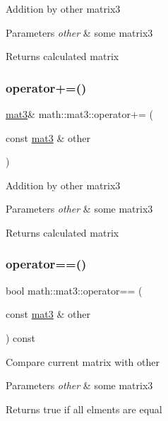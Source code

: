 Addition by other matrix3 
\begin{DoxyParams}{Parameters}
{\em other} & some matrix3 \\
\hline
\end{DoxyParams}
\begin{DoxyReturn}{Returns}
calculated matrix 
\end{DoxyReturn}
\mbox{\label{structmath_1_1mat3_a7517611ee9bfdee69f05000296afa06c}} 
\subsubsection{\texorpdfstring{operator+=()}{operator+=()}}
{\footnotesize\ttfamily \hyperlink{structmath_1_1mat3}{mat3}\& math\+::mat3\+::operator+= (\begin{DoxyParamCaption}\item[{const \hyperlink{structmath_1_1mat3}{mat3} \&}]{other }\end{DoxyParamCaption})\hspace{0.3cm}{\ttfamily [inline]}}

Addition by other matrix3 
\begin{DoxyParams}{Parameters}
{\em other} & some matrix3 \\
\hline
\end{DoxyParams}
\begin{DoxyReturn}{Returns}
calculated matrix 
\end{DoxyReturn}
\mbox{\label{structmath_1_1mat3_a48229882fcbf1ed5c8e4a04080ce4953}} 
\subsubsection{\texorpdfstring{operator==()}{operator==()}}
{\footnotesize\ttfamily bool math\+::mat3\+::operator== (\begin{DoxyParamCaption}\item[{const \hyperlink{structmath_1_1mat3}{mat3} \&}]{other }\end{DoxyParamCaption}) const\hspace{0.3cm}{\ttfamily [inline]}}

Compare current matrix with other 
\begin{DoxyParams}{Parameters}
{\em other} & some matrix3 \\
\hline
\end{DoxyParams}
\begin{DoxyReturn}{Returns}
true if all elments are equal 
\end{DoxyReturn}
\mbox{\label{structmath_1_1mat3_a0e79a421b93c08169b6df3961426825e}} 
